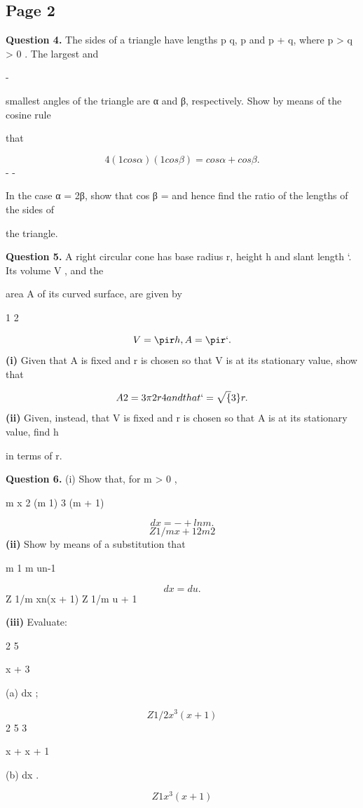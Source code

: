 \documentclass[12pt]{article}
\begin{document}
\subsection*{Page 2}
\begin{flushleft}
\bigskip\textbf{Question 4.} The sides of a triangle have lengths p q, p and p + q, where p > q > 0 . The largest and\par
-\par
smallest angles of the triangle are α and β, respectively. Show by means of the cosine rule\par
that\par
\[4(1 cos α)(1 cos β) = cos α + cos β .\]
- -\par
In the case α = 2β, show that cos β = and hence find the ratio of the lengths of the sides of\par
the triangle.\par
\bigskip\textbf{Question 5.} A right circular cone has base radius r, height h and slant length `. Its volume V , and the\par
area A of its curved surface, are given by\par
1 2\par
\[V = \pir h , A = \pir` .\]
\textbf{(i)} Given that A is fixed and r is chosen so that V is at its stationary value, show that\par
\[A 2 = 3\pi 2 r 4 and that ` = \sqrt\{3\} r.\]
\textbf{(ii)} Given, instead, that V is fixed and r is chosen so that A is at its stationary value, find h\par
in terms of r.\par
\bigskip\textbf{Question 6.} (i) Show that, for m > 0 ,\par
m x 2 (m 1) 3 (m + 1)\par
\[dx = - + ln m .\]
\[Z 1/m x + 1 2m2\]
\textbf{(ii)} Show by means of a substitution that\par
m 1 m un-1\par
\[dx = du .\]
Z 1/m xn(x + 1) Z 1/m u + 1\par
\textbf{(iii)} Evaluate:\par
2 5\par
x + 3\par
(a) dx ;\par
\[Z 1/2 x^3(x + 1)\]
2 5 3\par
x + x + 1\par
(b) dx .\par
\[Z 1 x^3(x + 1)\]
\end{flushleft}
\end{document}
